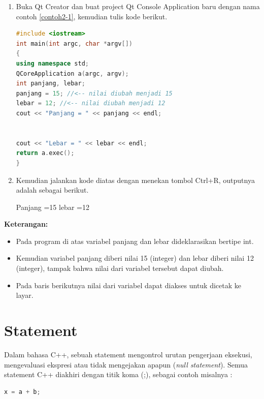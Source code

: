 \begin{enumerate}

\item
  Buka Qt Creator dan buat project Qt Console Application baru dengan
  nama contoh \ref{contoh2-1}, kemudian tulis kode berikut.

\begin{lstlisting}[language=c++, caption=Tipe data dan Identifier, label=contoh2-1]
#include <iostream>
int main(int argc, char *argv[])
{
using namespace std;
QCoreApplication a(argc, argv);
int panjang, lebar;
panjang = 15; //<-- nilai diubah menjadi 15
lebar = 12; //<-- nilai diubah menjadi 12
cout << "Panjang = " << panjang << endl;


cout << "Lebar = " << lebar << endl;
return a.exec();
}
\end{lstlisting}

\item
  Kemudian jalankan kode diatas dengan menekan tombol Ctrl+R, outputnya
  adalah sebagai berikut.

\begin{lcverbatim}
Panjang =15
lebar =12
\end{lcverbatim}

\end{enumerate}


\textbf{Keterangan:}

\begin{itemize}

\item
  Pada program di atas variabel panjang dan lebar dideklarasikan bertipe
  int.
\item
  Kemudian variabel panjang diberi nilai 15 (integer) dan lebar diberi
  nilai 12 (integer), tampak bahwa nilai dari variabel tersebut dapat
  diubah.
\item
  Pada baris berikutnya nilai dari variabel dapat diakses untuk dicetak
  ke layar.
\end{itemize}

\section{Statement}\label{statement}

Dalam bahasa C++, sebuah statement mengontrol urutan pengerjaan
eksekusi, mengevaluasi ekspresi atau tidak mengejakan apapun (\emph{null
statement}). Semua statement C++ diakhiri dengan titik koma (;), sebagai
contoh misalnya :

\begin{lstlisting}[language=c++, numbers=none]
x = a + b;
\end{lstlisting}

